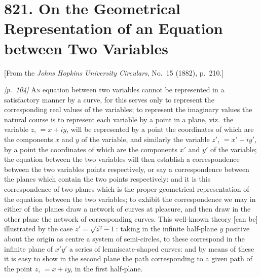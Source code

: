 \documentclass[11pt,a4paper]{article}
\theoremstyle{plain}
\theoremstyle{definition}
\theoremstyle{remark}
\begin{document}
\bigskip

\newpage
\section*{821. On the Geometrical Representation of an Equation between Two Variables}

\begin{center}
\small[From the \textit{Johns Hopkins University Circulars}, No.~15 (1882), p.~210.]
\end{center}

\bigskip

\noindent\textit{[p.~104]} \textsc{An} equation between two variables cannot be represented in a satisfactory manner by a curve, for this serves only to represent the corresponding real values of the variables; to represent the imaginary values the natural course is to represent each variable by a point in a plane, viz.\ the variable $z$, $= x + iy$, will be represented by a point the coordinates of which are the components $x$ and $y$ of the variable, and similarly the variable $z'$, $= x' + iy'$, by a point the coordinates of which are the components $x'$ and $y'$ of the variable; the equation between the two variables will then establish a correspondence between the two variables points respectively, or say a correspondence between the planes which contain the two points respectively: and it is this correspondence of two planes which is the proper geometrical representation of the equation between the two variables; to exhibit the correspondence we may in either of the planes draw a network of curves at pleasure, and then draw in the other plane the network of corresponding curves. This well-known theory [can be] illustrated by the case $z' = \sqrt{z^2 - 1}$: taking in the infinite half-plane $y$ positive about the origin as centre a system of semi-circles, to these correspond in the infinite plane of $x'y'$ a series of lemniscate-shaped curves: and by means of these it is easy to show in the second plane the path corresponding to a given path of the point $z$, $= x + iy$, in the first half-plane.

\bigskip

\newpage
\end{document}
